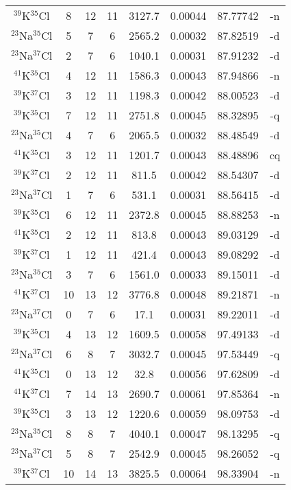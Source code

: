 \begin{table*}[htp]
\begin{tabular}{cccccccc}
$^{39}$K$^{35}$Cl & 8 & 12 & 11 & 3127.7 & 0.00044 & 87.77742 & -n \\
$^{23}$Na$^{35}$Cl & 5 & 7 & 6 & 2565.2 & 0.00032 & 87.82519 & -d \\
$^{23}$Na$^{37}$Cl & 2 & 7 & 6 & 1040.1 & 0.00031 & 87.91232 & -d \\
$^{41}$K$^{35}$Cl & 4 & 12 & 11 & 1586.3 & 0.00043 & 87.94866 & -n \\
$^{39}$K$^{37}$Cl & 3 & 12 & 11 & 1198.3 & 0.00042 & 88.00523 & -d \\
$^{39}$K$^{35}$Cl & 7 & 12 & 11 & 2751.8 & 0.00045 & 88.32895 & -q \\
$^{23}$Na$^{35}$Cl & 4 & 7 & 6 & 2065.5 & 0.00032 & 88.48549 & -d \\
$^{41}$K$^{35}$Cl & 3 & 12 & 11 & 1201.7 & 0.00043 & 88.48896 & cq \\
$^{39}$K$^{37}$Cl & 2 & 12 & 11 & 811.5 & 0.00042 & 88.54307 & -d \\
$^{23}$Na$^{37}$Cl & 1 & 7 & 6 & 531.1 & 0.00031 & 88.56415 & -d \\
$^{39}$K$^{35}$Cl & 6 & 12 & 11 & 2372.8 & 0.00045 & 88.88253 & -n \\
$^{41}$K$^{35}$Cl & 2 & 12 & 11 & 813.8 & 0.00043 & 89.03129 & -d \\
$^{39}$K$^{37}$Cl & 1 & 12 & 11 & 421.4 & 0.00043 & 89.08292 & -d \\
$^{23}$Na$^{35}$Cl & 3 & 7 & 6 & 1561.0 & 0.00033 & 89.15011 & -d \\
$^{41}$K$^{37}$Cl & 10 & 13 & 12 & 3776.8 & 0.00048 & 89.21871 & -n \\
$^{23}$Na$^{37}$Cl & 0 & 7 & 6 & 17.1 & 0.00031 & 89.22011 & -d \\
$^{39}$K$^{35}$Cl & 4 & 13 & 12 & 1609.5 & 0.00058 & 97.49133 & -d \\
$^{23}$Na$^{37}$Cl & 6 & 8 & 7 & 3032.7 & 0.00045 & 97.53449 & -q \\
$^{41}$K$^{35}$Cl & 0 & 13 & 12 & 32.8 & 0.00056 & 97.62809 & -d \\
$^{41}$K$^{37}$Cl & 7 & 14 & 13 & 2690.7 & 0.00061 & 97.85364 & -n \\
$^{39}$K$^{35}$Cl & 3 & 13 & 12 & 1220.6 & 0.00059 & 98.09753 & -d \\
$^{23}$Na$^{35}$Cl & 8 & 8 & 7 & 4040.1 & 0.00047 & 98.13295 & -q \\
$^{23}$Na$^{37}$Cl & 5 & 8 & 7 & 2542.9 & 0.00045 & 98.26052 & -q \\
$^{39}$K$^{37}$Cl & 10 & 14 & 13 & 3825.5 & 0.00064 & 98.33904 & -n \\

\end{tabular}
\end{table*}
